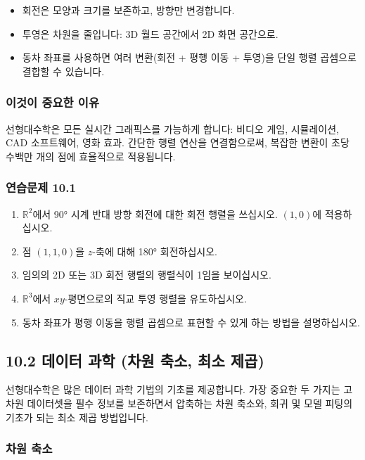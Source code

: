 \documentclass[
  12pt,
  a4paper,
]{article}
\begin{document}
\begin{itemize}
\item
  회전은 모양과 크기를 보존하고, 방향만 변경합니다.
\item
  투영은 차원을 줄입니다: 3D 월드 공간에서 2D 화면 공간으로.
\item
  동차 좌표를 사용하면 여러 변환(회전 + 평행 이동 + 투영)을 단일 행렬 곱셈으로 결합할 수 있습니다.
\end{itemize}

\subsubsection{이것이 중요한 이유}\label{why-this-matters-36}

선형대수학은 모든 실시간 그래픽스를 가능하게 합니다: 비디오 게임, 시뮬레이션, CAD 소프트웨어, 영화 효과. 간단한 행렬 연산을 연결함으로써, 복잡한 변환이 초당 수백만 개의 점에 효율적으로 적용됩니다.

\subsubsection{연습문제 10.1}\label{exercises-101}

\begin{enumerate}
\def\labelenumi{\arabic{enumi}.}
\item
  \(\mathbb{R}^2\)에서 90° 시계 반대 방향 회전에 대한 회전 행렬을 쓰십시오. \((1,0)\)에 적용하십시오.
\item
  점 \((1,1,0)\)을 \(z\)-축에 대해 180° 회전하십시오.
\item
  임의의 2D 또는 3D 회전 행렬의 행렬식이 1임을 보이십시오.
\item
  \(\mathbb{R}^3\)에서 \(xy\)-평면으로의 직교 투영 행렬을 유도하십시오.
\item
  동차 좌표가 평행 이동을 행렬 곱셈으로 표현할 수 있게 하는 방법을 설명하십시오.
\end{enumerate}

\subsection{10.2 데이터 과학 (차원 축소, 최소 제곱)}\label{102-data-science-dimensionality-reduction-least-squares}

선형대수학은 많은 데이터 과학 기법의 기초를 제공합니다. 가장 중요한 두 가지는 고차원 데이터셋을 필수 정보를 보존하면서 압축하는 차원 축소와, 회귀 및 모델 피팅의 기초가 되는 최소 제곱 방법입니다.

\subsubsection{차원 축소}\label{dimensionality-reduction}
\end{document}
